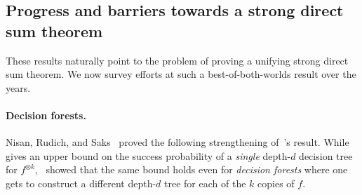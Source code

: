 




  


\subsection{Progress and barriers towards a strong direct sum theorem}


These results naturally point to the problem of proving a unifying strong direct sum theorem. We now survey efforts at such a best-of-both-worlds result over the years. 

\paragraph{Decision forests.} Nisan, Rudich, and Saks~\cite{NRS94} proved the following strengthening of~\cite{IRW94}’s result. While~\cite{IRW94} gives an upper bound on the success probability of a {\sl single} depth-$d$ decision tree for $f^{\otimes k}$,~\cite{NRS94} showed that the same bound holds even for {\sl decision forests} where one gets to construct a different depth-$d$ tree for each of the $k$ copies of $f$.     

